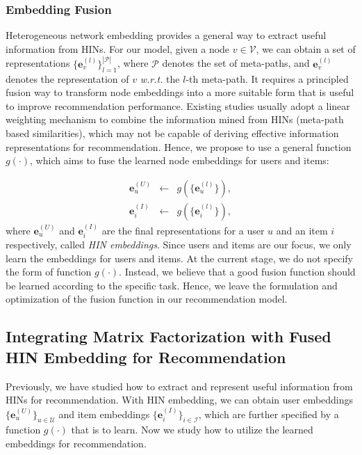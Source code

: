 \subsubsection{Embedding Fusion}
Heterogeneous network embedding provides a general way to extract useful information from HINs.
For our model, given a node $v \in \mathcal{V}$, we can obtain a set of representations $\{ \bm{e}^{(l)}_v \}_{l=1}^{|\mathcal{P}|}$,
where $\mathcal{P}$ denotes the set of meta-paths, and $\bm{e}^{(l)}_v$ denotes the representation of $v$ \emph{w.r.t.} the $l$-th meta-path.
It requires a principled fusion way to transform node embeddings into a more suitable form that is useful to improve recommendation performance.
Existing studies usually adopt a linear weighting mechanism to combine the information mined from HINs (\eg meta-path based similarities), which may not be capable of deriving effective information representations for recommendation.
Hence, we propose to use a general function $g(\cdot)$, which aims to fuse the learned node embeddings for users and items:

\begin{eqnarray}\label{eq-eui}
\bm{e}^{(U)}_u &\leftarrow& g(\{\bm{e}^{(l)}_u\}),\\
\bm{e}^{(I)}_i &\leftarrow& g(\{\bm{e}^{(l)}_i\}),\nonumber
\end{eqnarray}
where $\bm{e}^{(U)}_u$ and $\bm{e}^{(I)}_i$ are the final representations for a user $u$ and an item $i$ respectively, called \emph{HIN embeddings}.
Since users and items are our focus, we only learn the embeddings for users and items.
At the current stage, we do not specify the form of function $g(\cdot)$. Instead, we believe that
a good fusion function should be learned according to the specific task. Hence, we leave the formulation and optimization of the fusion function
in our recommendation model.


\subsection{Integrating Matrix Factorization with Fused HIN Embedding for Recommendation}
Previously, we have studied how to extract and represent useful information from HINs for recommendation.
With HIN embedding, we can obtain user embeddings $\{\bm{e}^{(U)}_u\}_{u \in \mathcal{U}}$ and item embeddings $\{\bm{e}^{(I)}_i\}_{i \in \mathcal{I}}$, which are further specified by a function $g(\cdot)$ that is to learn. Now we study how to utilize the learned embeddings for recommendation.

